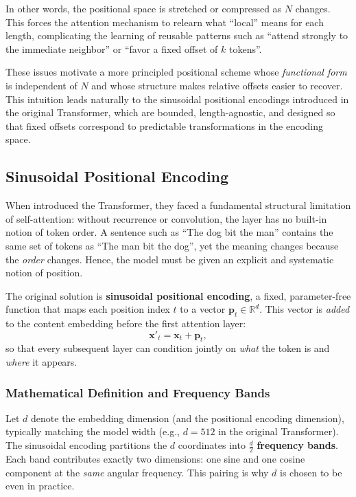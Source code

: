 \begin{itemize}
\begin{itemize}
		\newpage
		
		In other words, the positional space is stretched or compressed as \(N\) changes.
		This forces the attention mechanism to relearn what ``local'' means for each length, complicating the learning of reusable patterns such as
		``attend strongly to the immediate neighbor'' or ``favor a fixed offset of \(k\) tokens''.
		
		\noindent
		These issues motivate a more principled positional scheme whose \emph{functional form} is independent of \(N\) and whose structure makes
		relative offsets easier to recover.
		This intuition leads naturally to the sinusoidal positional encodings introduced in the original Transformer, which are bounded, length-agnostic,
		and designed so that fixed offsets correspond to predictable transformations in the encoding space.
	\end{itemize}
\end{itemize}

\subsection{Sinusoidal Positional Encoding}
\label{subsec:chapter17_sinusoidal_encoding}

\noindent
When \citeauthor{vaswani2017_attention} introduced the Transformer, they faced a fundamental structural limitation of self-attention: without recurrence or convolution, the layer has no built-in notion of token order.
A sentence such as ``The dog bit the man'' contains the same set of tokens as ``The man bit the dog'', yet the meaning changes because the \emph{order} changes.
Hence, the model must be given an explicit and systematic notion of position.

\noindent
The original solution is \textbf{sinusoidal positional encoding}, a fixed, parameter-free function that maps each position index \(t\) to a vector \(\mathbf{p}_t \in \mathbb{R}^{d}\).
This vector is \emph{added} to the content embedding before the first attention layer:
\begin{equation}
	\label{eq:chapter17_pe_addition}
	\mathbf{x}'_t = \mathbf{x}_t + \mathbf{p}_t,
\end{equation}
so that every subsequent layer can condition jointly on \emph{what} the token is and \emph{where} it appears.

\subsubsection{Mathematical Definition and Frequency Bands}
\noindent
Let \(d\) denote the embedding dimension (and the positional encoding dimension), typically matching the model width (e.g., \(d=512\) in the original Transformer).
The sinusoidal encoding partitions the \(d\) coordinates into \(\frac{d}{2}\) \textbf{frequency bands}.
Each band contributes exactly two dimensions: one sine and one cosine component at the \emph{same} angular frequency.
This pairing is why \(d\) is chosen to be even in practice.

